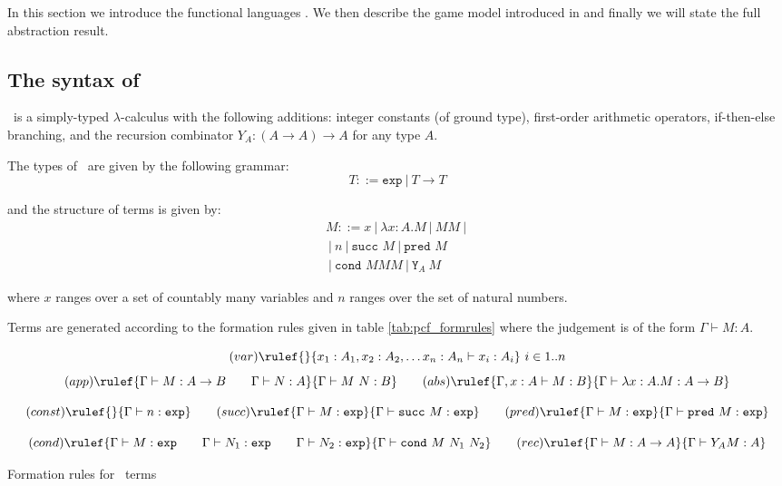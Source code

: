 In this section we introduce the functional languages \pcf. We then
describe the game model introduced in \cite{abramsky94full} and
finally we will state the full abstraction result.

\subsection{The syntax of \pcf}
\pcf\ is a simply-typed $\lambda$-calculus with the following
additions: integer constants  (of ground type), first-order
arithmetic operators, if-then-else branching, and the recursion
combinator $Y_A : (A\rightarrow A)\rightarrow A$ for any type $A$.

The types of \pcf\ are given by the following grammar:
$$ T ::= \texttt{exp}\ |\ T \rightarrow T$$

and the structure of terms is given by:
\begin{eqnarray*}
 M ::= x\ |\ \lambda x :A . M \ |\ M M \ |\ \\
\ |\ n \ |\ \texttt{succ } M \ |\  \texttt{pred } M \\
\ |\ \texttt{cond } M M M \ |\ \texttt{Y}_A\ M
\end{eqnarray*}

where $x$ ranges over a set of countably many variables and $n$
ranges over the set of natural numbers.

Terms are generated according to the formation rules given in table
\ref{tab:pcf_formrules} where the judgement is of the form $ \Gamma  \vdash M : A$.

\begin{table}[htbp]
$$ (var) \rulef{}{x_1:A_1, x_2:A_2, \ldots x_n : A_n  \vdash x_i : A_i}\ i \in 1..n$$
$$ (app) \rulef{\Gamma \vdash M : A\rightarrow B \qquad \Gamma \vdash N:A}{\Gamma \vdash M\ N : B}
\qquad (abs) \rulef{\Gamma, x:A \vdash M : B}{\Gamma \vdash \lambda x :A . M : A\rightarrow B}$$

$$ (const) \rulef{}{\Gamma \vdash n :\texttt{exp}}
\qquad (succ) \rulef{\Gamma \vdash M:\texttt{exp} }{\Gamma \vdash \texttt{succ}\ M:\texttt{exp}}
\qquad (pred) \rulef{\Gamma \vdash M:\texttt{exp} }{\Gamma \vdash \texttt{pred}\ M:\texttt{exp}}$$

$$
(cond) \rulef{\Gamma \vdash M : \texttt{exp} \qquad \Gamma \vdash N_1 : \texttt{exp} \qquad \Gamma \vdash N_2 : \texttt{exp} }{\Gamma \vdash \texttt{cond}\ M\ N_1\ N_2}
\qquad  (rec) \rulef{\Gamma \vdash M : A\rightarrow A }{ \Gamma \vdash Y_A M : A}$$

\caption{Formation rules for \pcf\ terms}
\label{tab:pcf_formrules}
\end{table}

